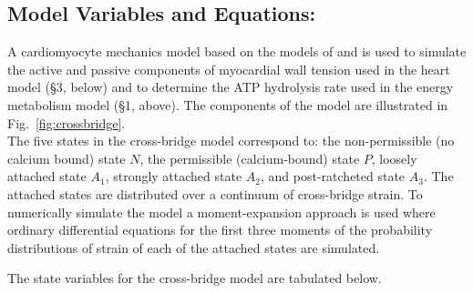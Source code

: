 \documentclass[fleqn,10pt]{physiome}
\begin{document}
\subsection{Model Variables and Equations:}

A cardiomyocyte mechanics model based on the models of \cite{Tewari2016a,Tewari2016b} and \cite{Campbell2018} is used to simulate the active and passive components of myocardial wall tension used in the heart model (§3, below) and to determine the ATP hydrolysis rate used in the energy metabolism model (§1, above). The components of the model are illustrated in  Fig.~\ref{fig:crossbridge}.\\



The five states in the cross-bridge model correspond to: the non-permissible (no calcium bound) state $N$, the permissible (calcium-bound) state $P$, loosely attached state $A_1$, strongly attached state $A_2$, and post-ratcheted state $A_3$. The attached states are distributed over a continuum of cross-bridge strain. To numerically simulate the model a moment-expansion approach is used where ordinary differential equations for the first three moments of the probability distributions of strain of each of the attached states are simulated. 

The state variables for the cross-bridge model are tabulated below.
\end{document}
